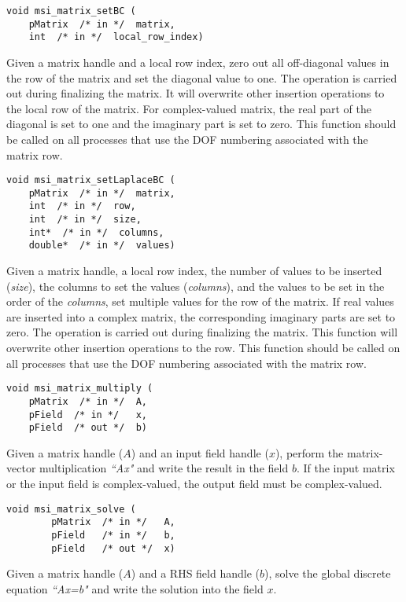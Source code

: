 \begin{verbatim}
void msi_matrix_setBC (
    pMatrix  /* in */  matrix, 
    int  /* in */  local_row_index)
\end{verbatim}\vspace{-.5cm}\hspace{1cm}
Given a matrix handle and a local row index, zero out all off-diagonal values in the row of the matrix and set the diagonal value to one. The operation is carried out during finalizing the matrix. It will overwrite other insertion operations to the local row of the matrix. For complex-valued matrix, the real part of the diagonal is set to one and the imaginary part is set to zero.
This function should be called on all processes that use the DOF numbering associated with the matrix row. 

\begin{verbatim}
void msi_matrix_setLaplaceBC (
    pMatrix  /* in */  matrix, 
    int  /* in */  row, 
    int  /* in */  size, 
    int*  /* in */  columns, 
    double*  /* in */  values)
\end{verbatim}\vspace{-.5cm}\hspace{1cm}
Given a matrix handle, a local row index, the  number of values to be inserted (\textit{size}), the columns to set the values (\textit{columns}), and the values to be set in the order of the \textit{columns}, set multiple values for the row of the matrix. If real values are inserted into a complex matrix, the corresponding imaginary parts are set to zero. The operation is carried out during finalizing the matrix. 
This function will overwrite other insertion operations to the row. This function should be called on all processes that use the DOF numbering associated with the matrix row.

\begin{verbatim}
void msi_matrix_multiply (
    pMatrix  /* in */  A, 
    pField  /* in */   x, 
    pField  /* out */  b)
\end{verbatim}\vspace{-.5cm}\hspace{1cm}
Given a matrix handle ($A$) and an input field handle ($x$), perform the matrix-vector multiplication \textit{``Ax"} and write the result in the field $b$. If the input matrix or the input field is complex-valued, the output field must be complex-valued.

\begin{verbatim}
void msi_matrix_solve (
        pMatrix  /* in */   A, 
        pField   /* in */   b, 
        pField   /* out */  x)
\end{verbatim}\vspace{-.5cm}\hspace{1cm}
Given a matrix handle ($A$) and a RHS field handle ($b$), solve the global discrete equation \textit{``Ax=b"} and write the solution into the field $x$. 

